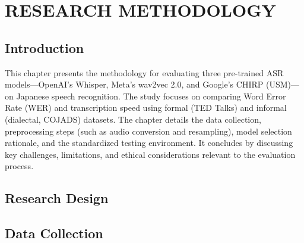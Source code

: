 

\chapter{RESEARCH METHODOLOGY}

\section{Introduction}
This chapter presents the methodology for evaluating three pre-trained ASR models—OpenAI’s Whisper, Meta’s wav2vec 2.0, and Google’s CHIRP (USM)—on Japanese speech recognition. The study focuses on comparing Word Error Rate (WER) and transcription speed using formal (TED Talks) and informal (dialectal, COJADS) datasets. The chapter details the data collection, preprocessing steps (such as audio conversion and resampling), model selection rationale, and the standardized testing environment. It concludes by discussing key challenges, limitations, and ethical considerations relevant to the evaluation process.

\section{Research Design}




\section{Data Collection}
